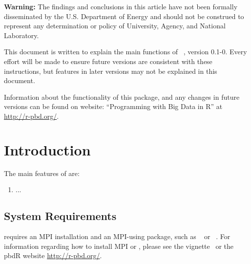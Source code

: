 {\color{red} \bf Warning:}
The findings and conclusions in this article have not been
formally disseminated by the U.S. Department of Energy
and should not be construed to represent any determination or
policy of University, Agency, and National Laboratory.

This document is written to explain the main
functions of ~\citep{Sehrawat2013pbdPROFpackage}, version 0.1-0.
Every effort will be made to ensure future versions are consistent with
these instructions, but features in later versions may not be explained
in this document.

Information about the functionality of this package,
and any changes in future versions can be found on website:
``Programming with Big Data in R'' at
\url{http://r-pbd.org/}.



\section{Introduction}
\label{sec:introduction}

The main features of  are:
\begin{enumerate}
\item ...
\end{enumerate}


\subsection[System Requirements]{System Requirements}
\label{sec:system_requirements}

 requires an MPI installation and an MPI-using package, such as ~\citep{Chen2012pbdMPIpackage} or
~\citep{Yu2010}.  For information regarding how to install MPI or , please see the  vignette~\citep{Chen2012pbdMPIvignette} or the pbdR website \url{http://r-pbd.org/}.

